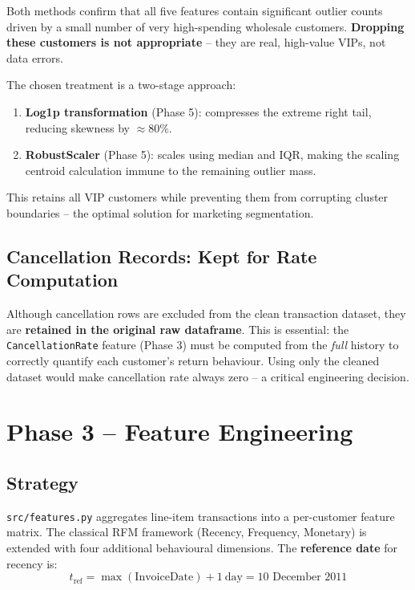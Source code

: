 \documentclass[12pt,a4paper]{report}
\begin{document}
Both methods confirm that all five features contain significant outlier counts driven by a small number of very high-spending wholesale customers. \textbf{Dropping these customers is not appropriate} -- they are real, high-value VIPs, not data errors.

The chosen treatment is a two-stage approach:
\begin{enumerate}[leftmargin=1.8em]
  \item \textbf{Log1p transformation} (Phase 5): compresses the extreme right tail, reducing skewness by $\approx 80\%$.
  \item \textbf{RobustScaler} (Phase 5): scales using median and IQR, making the scaling centroid calculation immune to the remaining outlier mass.
\end{enumerate}

This retains all VIP customers while preventing them from corrupting cluster boundaries -- the optimal solution for marketing segmentation.

\section{Cancellation Records: Kept for Rate Computation}

Although cancellation rows are excluded from the clean transaction dataset, they are \textbf{retained in the original raw dataframe}. This is essential: the \texttt{CancellationRate} feature (Phase 3) must be computed from the \emph{full} history to correctly quantify each customer's return behaviour. Using only the cleaned dataset would make cancellation rate always zero -- a critical engineering decision.

\chapter{Phase 3 -- Feature Engineering}

\section{Strategy}

\texttt{src/features.py} aggregates line-item transactions into a per-customer feature matrix. The classical RFM framework (Recency, Frequency, Monetary) is extended with four additional behavioural dimensions. The \textbf{reference date} for recency is:
\[
t_{\text{ref}} = \max(\text{InvoiceDate}) + 1\ \text{day} = \text{10 December 2011}
\]
\end{document}

